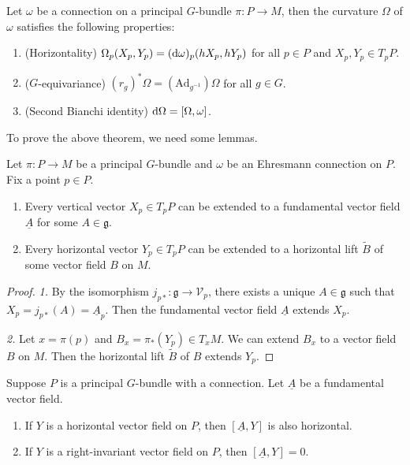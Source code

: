 \begin{theorem}\label{thm:properties of curvature}
    Let $\omega$ be a connection on a principal $G$-bundle $\pi: P\to M$, 
    then the curvature $\Omega$ of $\omega$ satisfies the following properties:
    \begin{enumerate}
        \item {\rm(}Horizontality{\rm)} $\Omega_p(X_p, Y_p) = ({\rm d}\omega)_p(hX_p, hY_p)$ for all $p\in P$ and $X_p, Y_p\in T_pP$.
        \item {\rm(}$G$-equivariance{\rm)} $(r_g)^*\Omega = (\mathrm{Ad}_{g^{-1}})\Omega$ for all $g\in G$.
        \item {\rm(}Second Bianchi identity{\rm)} ${\rm d}\Omega = [\Omega, \omega]$.
    \end{enumerate}
\end{theorem}
To prove the above theorem, we need some lemmas. 
\begin{lemma}
    Let $\pi: P\to M$ be a principal $G$-bundle and $\omega$ be an Ehresmann connection on $P$. 
    Fix a point $p\in P$. 
    \begin{enumerate}
        \item Every vertical vector $X_p\in T_pP$ can be extended to a fundamental vector field $\underline{A}$ for some $A\in\mathfrak{g}$. 
        \item Every horizontal vector $Y_p\in T_pP$ can be extended to a horizontal lift $\tilde{B}$ of some vector field $B$ on $M$.
    \end{enumerate}
\end{lemma}
\begin{proof}
    \textit{1.} By the isomorphism $j_{p*}: \mathfrak{g}\to \mathcal{V}_p$, there exists a unique $A\in\mathfrak{g}$ such that $X_p = j_{p*}(A) = \underline{A}_p$. 
    Then the fundamental vector field $\underline{A}$ extends $X_p$.

    \noindent\textit{2.} Let $x = \pi(p)$ and $B_x=\pi_*(Y_p)\in T_xM$. We can extend $B_x$ to a vector field $B$ on $M$. 
    Then the horizontal lift $\tilde{B}$ of $B$ extends $Y_p$.
\end{proof}
\begin{lemma}
    Suppose $P$ is a principal $G$-bundle with a connection. Let $\underline{A}$ be a fundamental vector field.
    \begin{enumerate}
        \item If $Y$ is a horizontal vector field on $P$, then $[\underline{A}, Y]$ is also horizontal.
        \item If $Y$ is a right-invariant vector field on $P$, then $[\underline{A}, Y]=0$. 
    \end{enumerate}
\end{lemma}
